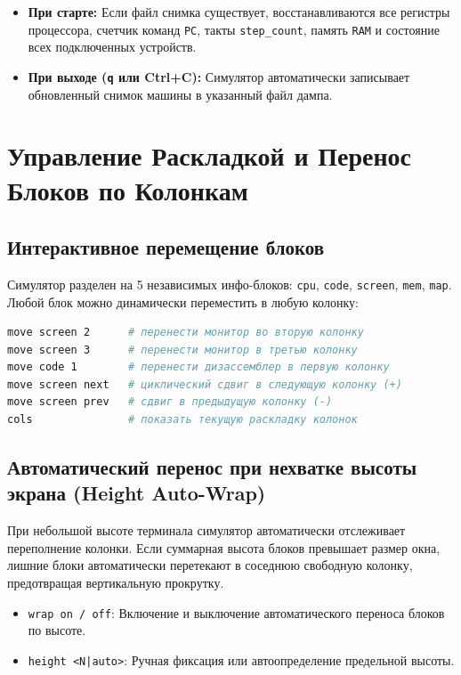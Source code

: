 \documentclass[11pt,a4paper]{article}
\begin{document}
\begin{itemize}
    \item \textbf{При старте:} Если файл снимка существует, восстанавливаются все регистры процессора, счетчик команд \texttt{PC}, такты \texttt{step\_count}, память \texttt{RAM} и состояние всех подключенных устройств.
    \item \textbf{При выходе (\texttt{q} или Ctrl+C):} Симулятор автоматически записывает обновленный снимок машины в указанный файл дампа.
\end{itemize}

\section{Управление Раскладкой и Перенос Блоков по Колонкам}

\subsection{Интерактивное перемещение блоков}
Симулятор разделен на 5 независимых инфо-блоков: \texttt{cpu}, \texttt{code}, \texttt{screen}, \texttt{mem}, \texttt{map}. Любой блок можно динамически переместить в любую колонку:
\begin{lstlisting}[language=bash]
move screen 2      # перенести монитор во вторую колонку
move screen 3      # перенести монитор в третью колонку
move code 1        # перенести дизассемблер в первую колонку
move screen next   # циклический сдвиг в следующую колонку (+)
move screen prev   # сдвиг в предыдущую колонку (-)
cols               # показать текущую раскладку колонок
\end{lstlisting}

\subsection{Автоматический перенос при нехватке высоты экрана (Height Auto-Wrap)}
При небольшой высоте терминала симулятор автоматически отслеживает переполнение колонки. Если суммарная высота блоков превышает размер окна, лишние блоки автоматически перетекают в соседнюю свободную колонку, предотвращая вертикальную прокрутку.
\begin{itemize}
    \item \texttt{wrap on / off}: Включение и выключение автоматического переноса блоков по высоте.
    \item \texttt{height <N|auto>}: Ручная фиксация или автоопределение предельной высоты.
\end{itemize}
\end{document}
